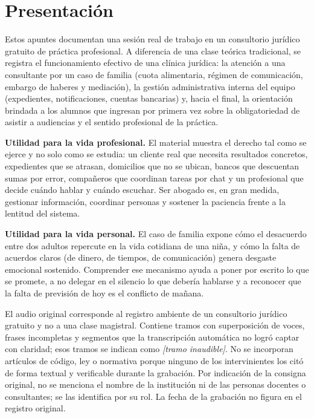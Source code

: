 \documentclass[12pt,oneside]{book}
\begin{document}
\chapter*{Presentaci\'on}

Estos apuntes documentan una sesi\'on real de trabajo en un consultorio jur\'idico gratuito de pr\'actica profesional. A diferencia de una clase te\'orica tradicional, se registra el funcionamiento efectivo de una cl\'inica jur\'idica: la atenci\'on a una consultante por un caso de familia (cuota alimentaria, r\'egimen de comunicaci\'on, embargo de haberes y mediaci\'on), la gesti\'on administrativa interna del equipo (expedientes, notificaciones, cuentas bancarias) y, hacia el final, la orientaci\'on brindada a los alumnos que ingresan por primera vez sobre la obligatoriedad de asistir a audiencias y el sentido profesional de la pr\'actica.

\textbf{Utilidad para la vida profesional.} El material muestra el derecho tal como se ejerce y no solo como se estudia: un cliente real que necesita resultados concretos, expedientes que se atrasan, domicilios que no se ubican, bancos que descuentan sumas por error, compa\~neros que coordinan tareas por chat y un profesional que decide cu\'ando hablar y cu\'ando escuchar. Ser abogado es, en gran medida, gestionar informaci\'on, coordinar personas y sostener la paciencia frente a la lentitud del sistema.

\textbf{Utilidad para la vida personal.} El caso de familia expone c\'omo el desacuerdo entre dos adultos repercute en la vida cotidiana de una ni\~na, y c\'omo la falta de acuerdos claros (de dinero, de tiempos, de comunicaci\'on) genera desgaste emocional sostenido. Comprender ese mecanismo ayuda a poner por escrito lo que se promete, a no delegar en el silencio lo que deber\'ia hablarse y a reconocer que la falta de previsi\'on de hoy es el conflicto de ma\~nana.

\begin{note}
El audio original corresponde al registro ambiente de un consultorio jur\'idico gratuito y no a una clase magistral. Contiene tramos con superposici\'on de voces, frases incompletas y segmentos que la transcripci\'on autom\'atica no logr\'o captar con claridad; esos tramos se indican como \emph{[tramo inaudible]}. No se incorporan art\'iculos de c\'odigo, ley o normativa porque ninguno de los intervinientes los cit\'o de forma textual y verificable durante la grabaci\'on. Por indicaci\'on de la consigna original, no se menciona el nombre de la instituci\'on ni de las personas docentes o consultantes; se las identifica por su rol. La fecha de la grabaci\'on no figura en el registro original.
\end{note}
\end{document}
